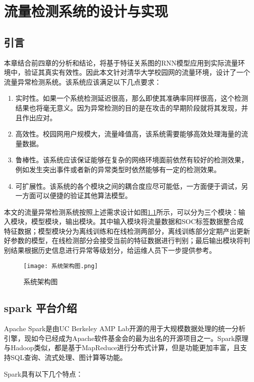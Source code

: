 \chapter{流量检测系统的设计与实现}
\section{引言}
本章结合前四章的分析和结论，将基于特征关系图的RNN模型应用到实际流量环境中，验证其真实有效性。因此本文针对清华大学校园网的流量环境，设计了一个流量异常检测系统。该系统应该满足以下几点要求：
\begin{enumerate}
  \item 实时性。如果一个系统检测延迟很高，那么即使其准确率同样很高，这个检测结果也将毫无意义。因为异常检测的目的是在攻击的早期阶段就将其发现，并且作出应对。
  \item 高效性。校园网用户规模大，流量峰值高，该系统需要能够高效处理海量的流量数据。
  \item 鲁棒性。该系统应该保证能够在复杂的网络环境面前依然有较好的检测效果，例如发生突出事件或者新的异常类型时依然能够有一定的检测效果。
  \item 可扩展性。该系统的各个模块之间的耦合度应尽可能低，一方面便于调试，另一方面可以便捷的验证其他算法模型。
\end{enumerate}

本文的流量异常检测系统按照上述需求设计如图\ref{fig:arch}所示，可以分为三个模块：输入模块，模型模块，输出模块。其中输入模块将流量数据和SOC标签数据整合成特征数据；模型模块分为离线训练和在线检测两部分，离线训练部分定期产出更新好参数的模型，在线检测部分会接受当前的特征数据进行判别；最后输出模块将判别结果根据历史信息进行异常等级划分，给运维人员下一步提供参考。
\begin{figure}
    \centering
    \texttt{[image: 系统架构图.png]}
    \caption{系统架构图}
    \label{fig:arch}
  \end{figure}


\section{spark 平台介绍}
Apache Spark是由UC Berkeley AMP Lab开源的用于大规模数据处理的统一分析引擎\cite{spark}，现如今已经成为Apache软件基金会的最为出名的开源项目之一。Spark原理与Hadoop类似，都是基于MapReduce进行分布式计算，但是功能更加丰富，且支持SQL查询、流式处理、图计算等功能。

Spark具有以下几个特点：

